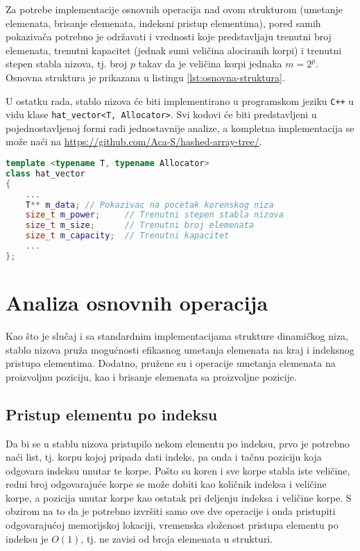 \documentclass[a4paper]{article}
\begin{document}
Za potrebe implementacije osnovnih operacija nad ovom strukturom (umetanje elemenata, brisanje elemenata, indeksni pristup elementima), pored samih pokazivača potrebno je održavati i vrednosti koje predstavljaju trenutni broj elemenata, trenutni kapacitet (jednak sumi veličina alociranih korpi) i trenutni stepen stabla nizova, tj. broj $p$ takav da je veličina korpi jednaka $m = 2^p$. Osnovna struktura je prikazana u listingu \ref{lst:osnovna-struktura}.

U ostatku rada, stablo nizova će biti implementirano u programskom jeziku \verb|C++| u vidu klase \verb|hat_vector<T, Allocator>|. Svi kodovi će biti predstavljeni u pojednostavljenoj formi radi jednostavnije analize, a kompletna implementacija se može naći na \url{https://github.com/Aca-S/hashed-array-tree/}.

\begin{lstlisting}[language=C++, caption={Osnovna struktura stabla nizova}, captionpos=b, label={lst:osnovna-struktura}]
template <typename T, typename Allocator>
class hat_vector
{
    ...
    T** m_data; // Pokazivac na pocetak korenskog niza
    size_t m_power;     // Trenutni stepen stabla nizova
    size_t m_size;      // Trenutni broj elemenata
    size_t m_capacity;  // Trenutni kapacitet
    ...
};
\end{lstlisting}

\section{Analiza osnovnih operacija}

Kao što je slučaj i sa standardnim implementacijama strukture dinamičkog niza, stablo nizova pruža mogućnosti efikasnog umetanja elemenata na kraj i indeksnog pristupa elementima. Dodatno, pružene su i operacije umetanja elemenata na proizvoljnu poziciju, kao i brisanje elemenata sa proizvoljne pozicije.

\subsection{Pristup elementu po indeksu}

Da bi se u stablu nizova pristupilo nekom elementu po indeksu, prvo je potrebno naći list, tj. korpu kojoj pripada dati indeks, pa onda i tačnu poziciju koja odgovara indeksu unutar te korpe. Pošto su koren i sve korpe stabla iste veličine, redni broj odgovarajuće korpe se može dobiti kao količnik indeksa i veličine korpe, a pozicija unutar korpe kao ostatak pri deljenju indeksa i veličine korpe. S obzirom na to da je potrebno izvršiti samo ove dve operacije i onda pristupiti odgovarajućoj memorijskoj lokaciji, vremenska složenost pristupa elementu po indeksu je $O(1)$, tj. ne zavisi od broja elemenata u strukturi.
\end{document}
